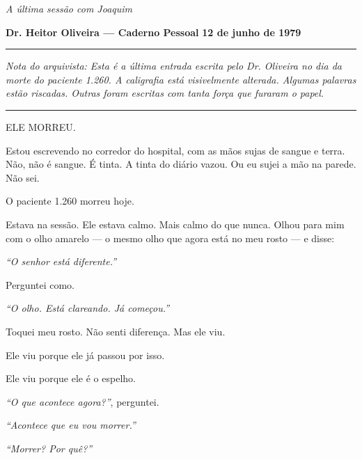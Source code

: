 
\noindent \textit{A última sessão com Joaquim}

\noindent \textbf{Dr. Heitor Oliveira --- Caderno Pessoal}
\textbf{12 de junho de 1979}

\vspace{0.5em}\noindent\rule{\textwidth}{0.5pt}\vspace{0.5em}

\noindent \textit{Nota do arquivista: Esta é a última entrada escrita pelo Dr. Oliveira no dia da morte do paciente 1.260. A caligrafia está visivelmente alterada. Algumas palavras estão riscadas. Outras foram escritas com tanta força que furaram o papel.}

\vspace{0.5em}\noindent\rule{\textwidth}{0.5pt}\vspace{0.5em}

\noindent ELE MORREU.

\noindent Estou escrevendo no corredor do hospital, com as mãos sujas de sangue e terra. Não, não é sangue. É tinta. A tinta do diário vazou. Ou eu sujei a mão na parede. Não sei.

\noindent O paciente 1.260 morreu hoje.

\noindent Estava na sessão. Ele estava calmo. Mais calmo do que nunca. Olhou para mim com o olho amarelo --- o mesmo olho que agora está no meu rosto --- e disse:

\noindent \textit{\textquotedblleft{}O senhor está diferente.\textquotedblright{}}

\noindent Perguntei como.

\noindent \textit{\textquotedblleft{}O olho. Está clareando. Já começou.\textquotedblright{}}

\noindent Toquei meu rosto. Não senti diferença. Mas ele viu.

\noindent Ele viu porque ele já passou por isso.

\noindent Ele viu porque ele é o espelho.

\noindent \textit{\textquotedblleft{}O que acontece agora?\textquotedblright{}}, perguntei.

\noindent \textit{\textquotedblleft{}Acontece que eu vou morrer.\textquotedblright{}}

\noindent \textit{\textquotedblleft{}Morrer? Por quê?\textquotedblright{}}

